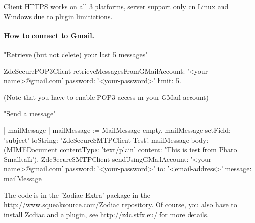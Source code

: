 \documentclass[a4paper,10pt,twoside]{book}
\begin{document}
Client HTTPS works on all 3 platforms, server support only on Linux and Windows due to plugin limitiations. 

\paragraph{How to connect to Gmail.}

\begin{code}{}
"Retrieve (but not delete) your last 5 messages" 

ZdcSecurePOP3Client 
       retrieveMessagesFromGMailAccount: '<your-name>@gmail.com' 
       password: '<your-password>' 
       limit: 5. 
\end{code}
(Note that you have to enable POP3 access in your GMail account) 


"Send a message" 
\begin{code}
| mailMessage | 
mailMessage := MailMessage empty. 
mailMessage setField: 'subject' toString: 'ZdcSecureSMTPClient Test'. 
mailMessage body: (MIMEDocument contentType: 'text/plain' content: 'This is test from Pharo Smalltalk'). 
ZdcSecureSMTPClient 
       sendUsingGMailAccount: '<your-name>@gmail.com' 
       password: '<your-password>' 
       to: '<email-address>' 
       message: mailMessage 
\end{code}

The code is in the 'Zodiac-Extra' package in the http://www.squeaksource.com/Zodiac repository. 
Of course, you also have to install Zodiac and a plugin, see http://zdc.stfx.eu/ for more details. 


\ifx\wholebook\relax\else
\end{document}
